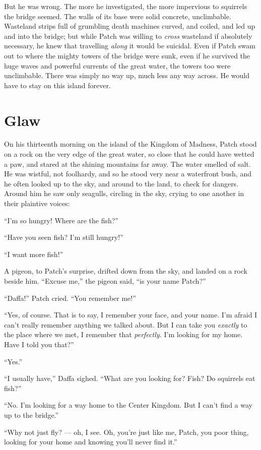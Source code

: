 \documentclass[ebook,oneside,openany,17pt]{memoir}
\newenvironment{tolerant}[1]{%
  \par\tolerance=#1\relax
}{%
  \par
}
\renewcommand{\thechapter}{\Roman{chapter}}
\newcounter{sections}
\newcommand{\sections}[1]{%
  \section*{#1}
  \addtocounter{sections}{1}%
  \pdfbookmark[1]{#1}{section.\thechapter.\thesections}}
\begin{document}
\begin{tolerant}{500}
But he was wrong. The more he investigated, the more impervious to
squirrels the bridge seemed. The walls of its base were solid
concrete, unclimbable. Wasteland strips full of grumbling death
machines curved, and coiled, and led up and into the bridge; but while
Patch was willing to \emph{cross} wasteland if absolutely necessary,
he knew that travelling \emph{along} it would be suicidal. Even if
Patch swam out to where the mighty towers of the bridge were sunk,
even if he survived the huge waves and powerful currents of the great
water, the towers too were unclimbable. There was simply no way up,
much less any way across. He would have to stay on this island
forever.
\end{tolerant}


\sections{Glaw}

On his thirteenth morning on the island of the Kingdom of Madness,
Patch stood on a rock on the very edge of the great water, so close
that he could have wetted a paw, and stared at the shining mountains
far away. The water smelled of salt. He was wistful, not foolhardy,
and so he stood very near a waterfront bush, and he often looked up to
the sky, and around to the land, to check for dangers. Around him he
saw only seagulls, circling in the sky, crying to one another in their
plaintive voices:

“I’m so hungry! Where are the fish?”

“Have you seen fish? I’m still hungry!”

“I want more fish!”

A pigeon, to Patch’s surprise, drifted down from the sky, and landed
on a rock beside him. “Excuse me,” the pigeon said, “is your name
Patch?”

“Daffa!” Patch cried. “You remember me!”

“Yes, of course. That is to say, I remember your face, and your
name. I’m afraid I can’t really remember anything we talked about. But
I can take you \emph{exactly} to the place where we met, I remember
that \emph{perfectly.} I’m looking for my home. Have I told you
that?”

“Yes.”

“I usually have,” Daffa sighed. “What are you looking for? Fish? Do
squirrels eat fish?”

“No. I’m looking for a way home to the Center Kingdom. But I can’t
find a way up to the bridge.”

“Why not just fly? — oh, I see. Oh, you’re just like me, Patch, you
poor thing, looking for your home and knowing you’ll never find it.”
\end{document}
